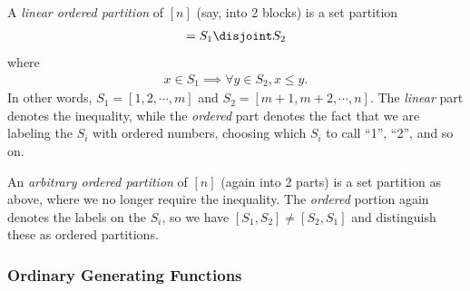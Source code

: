 A \emph{linear ordered partition} of \([n]\) (say, into 2 blocks) is a
set partition
\begin{align*}[n] = S_1 \disjoint S_2\end{align*} where
\begin{align*}x\in S_1 \implies \forall y\in S_2, x \leq y.\end{align*}
In other words, \(S_1 = [1, 2, \cdots, m]\) and
\(S_2 = [m+1, m+2, \cdots, n]\). The \emph{linear} part denotes the
inequality, while the \emph{ordered} part denotes the fact that we are
labeling the \(S_i\) with ordered numbers, choosing which \(S_i\) to
call ``1'', ``2'', and so on.

An \emph{arbitrary ordered partition} of \([n]\) (again into 2 parts) is
a set partition as above, where we no longer require the inequality. The
\emph{ordered} portion again denotes the labels on the \(S_i\), so we
have \([S_1, S_2] \neq [S_2, S_1]\) and distinguish these as ordered
partitions.

\newpage

\hypertarget{ordinary-generating-functions}{%
\subsubsection{Ordinary Generating
Functions}\label{ordinary-generating-functions}}

